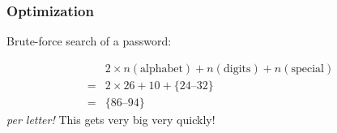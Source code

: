 \documentclass[11pt]{beamer}
\begin{document}
\begin{frame}[fragile]
  \frametitle{Optimization}
  \Enlarge

  \begin{enumerate}
  \myitem  Brute-force search of a password: %
  \end{enumerate}
  $$
  \begin{array}{ll}
      & 2 \times n(\textrm{alphabet}) + n(\textrm{digits}) + n(\textrm{special}) \\
    = & 2 \times 26 + 10 + \{24\textrm{--}32\} \\
    = & \{86\textrm{--}94\}
  \end{array}
  $$
  \emph{per letter!}  This gets very big very quickly!
\end{frame}

\end{document}
